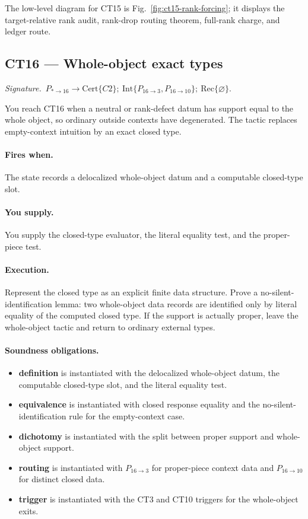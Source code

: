 \documentclass[
  11pt,
]{article}
\providecommand{\tightlist}{%
  \setlength{\itemsep}{0pt}\setlength{\parskip}{0pt}}
\theoremstyle{definition}
\newcommand{\ctsignature}[1]{\par\noindent\emph{Signature.}\ #1\par\medskip}
\newcommand{\ctcert}[1]{\mathrm{Cert}\{#1\}}
\newcommand{\ctint}[1]{\mathrm{Int}\{#1\}}
\newcommand{\ctrec}[1]{\mathrm{Rec}\{#1\}}
\newcommand{\ctnone}{\varnothing}
\newcommand{\ctpar}[1]{\paragraph{#1.}}
\begin{document}
The low-level diagram for CT15 is Fig.~\ref{fig:ct15-rank-forcing};
it displays the target-relative rank audit, rank-drop routing theorem,
full-rank charge, and ledger route.



\subsection{CT16 --- Whole-object exact types}\label{ct:16}\label{the-whole-object-piece-exact-types-under-context-degeneracy}
\ctsignature{\(P_{\ast\to16}\to \ctcert{C2};\ \ctint{P_{16\to3},P_{16\to10}};\ \ctrec{\ctnone}\).}

You reach CT16 when a neutral or rank-defect datum has support equal to
the whole object, so ordinary outside contexts have degenerated.  The
tactic replaces empty-context intuition by an exact closed type.

\ctpar{Fires when}
The state records a delocalized whole-object datum and a computable
closed-type slot.

\ctpar{You supply}
You supply the closed-type evaluator, the literal equality test, and the
proper-piece test.

\ctpar{Execution}
Represent the closed type as an explicit finite data structure. Prove a
no-silent-identification lemma: two whole-object data records are
identified only by literal equality of the computed closed type. If the
support is actually proper, leave the whole-object
tactic and return to ordinary external types.

\ctpar{Soundness obligations}
\begin{itemize}
\tightlist
\item \textbf{definition} is instantiated with the delocalized whole-object datum, the computable closed-type slot, and the literal equality test.
\item \textbf{equivalence} is instantiated with closed response equality and the no-silent-identification rule for the empty-context case.
\item \textbf{dichotomy} is instantiated with the split between proper support and whole-object support.
\item \textbf{routing} is instantiated with \(P_{16\to3}\) for proper-piece context data and \(P_{16\to10}\) for distinct closed data.
\item \textbf{trigger} is instantiated with the CT3 and CT10 triggers for the whole-object exits.
\end{itemize}
\end{document}
